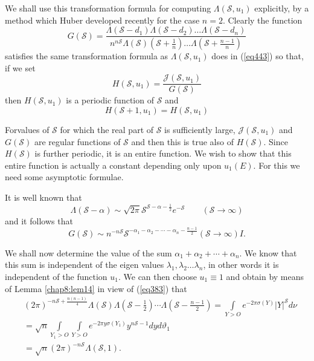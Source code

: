 We shall use this transformation formula for computing
$\Lambda(\mathscr{S},u_1)$ explicitly, by a method which Huber
developed recently for the case $n = 2$. Clearly the function 
\begin{equation*}
G(\mathscr{S}) = \frac{\Lambda(\mathscr{S}-d_1)
  \Lambda(\mathscr{S}-d_2)\ldots
  \Lambda(\mathscr{S}-d_n)}{n^{n\mathscr{S}}\Lambda
  (\mathscr{S})(\mathscr{S}+ \frac{1}{n})\ldots \Lambda(\mathscr{S}+
  \frac{n-1}{n})} \tag{444}\label{eq444} 
\end{equation*}
satisfies the same transformation formula as $\Lambda
(\mathscr{S},u_1)$ does in (\ref{eq443}) so that, if we set  
\begin{equation*}
H(\mathscr{S},u_1) =
\frac{\mathcal{J}(\mathscr{S},u_1)}{G(\mathscr{S})} \tag{445}\label{eq445} 
\end{equation*}
then $H(\mathscr{S},u_1)$ is a periodic function of $\mathscr{S}$ and  
\begin{equation*}
H(\mathscr{S}+ 1, u_1) = H(\mathscr{S},u_1) \tag{446}\label{eq446}
\end{equation*}

For\pageoriginale values of $\mathscr{S}$ for which the real part of
$\mathscr{S}$ is sufficiently large, $\mathcal{J}(\mathscr{S},u_1)$
and $G(\mathscr{S})$ are regular functions of $\mathscr{S}$ and then
this is true also of $H(\mathscr{S})$. Since $H(\mathscr{S})$ is further
periodic, it is an entire function. We wish to show that this entire
function is actually a constant depending only upon $u_1(E)$. For this
we need some asymptotic formulae. 

It is well known that 
$$
\Lambda(\mathscr{S}-\alpha) \sim \sqrt{2\pi}
\mathscr{S}^{\mathscr{S}-\alpha - \frac{1}{2}}    e^{-\mathscr{S}}
\qquad (\mathscr{S}\rightarrow \infty) 
$$
and it follows that 
\begin{equation*}
G(\mathscr{S}) \sim   n^{-n\mathscr{S}} \mathscr{S}^{-\alpha_1 -
  \alpha_2 - \cdots - \alpha_n - \frac{n-1}{2}} (\mathscr{S}
\rightarrow \infty)I. \tag{447}\label{eq447} 
\end{equation*}

We shall now determine the value of the sum $\alpha_1 + \alpha_2 +
\cdots + \alpha_n$. We know that this sum is independent of the eigen
values $\lambda_1,\lambda_2 \ldots \lambda_n$, in other words it is
independent of the function $u_1$. We can then choose $u_1 \equiv 1$
and obtain by means of Lemma \ref{chap8:lem14} in view of (\ref{eq383}) that 
\begin{align*}
& (2\pi)^{-n\mathscr{S}+\frac{n(n-1)}{4}}
  \Lambda(\mathscr{S})\Lambda(\mathscr{S}-\frac{1}{2}) \cdots
  \Lambda(\mathscr{S}-\frac{n-1}{2}) = \int\limits_{Y > O}
  e^{-2\pi\sigma(Y)}   | Y |^{\mathscr{S}}    d\nu\\ 
 & = \sqrt{n} \int\limits_{Y_1 > O} \int\limits_{Y > O}   e^{-2\pi   y
    \sigma(Y_1)}   y^{n \mathscr{S}-1}   dy   d\vartheta_1 \\ 
 & = \sqrt{n} (2\pi)^{-n\mathscr{S}} \Lambda(\mathscr{S},1).
\end{align*}

